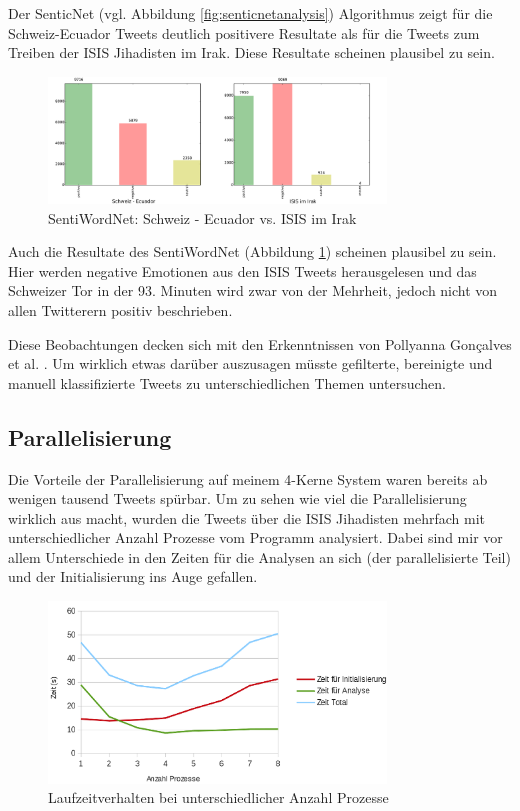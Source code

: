 Der SenticNet (vgl. Abbildung \ref{fig:senticnetanalysis}) Algorithmus zeigt für die Schweiz-Ecuador Tweets deutlich positivere Resultate als für die Tweets zum Treiben der ISIS Jihadisten im Irak. Diese Resultate scheinen plausibel zu sein.

\begin{figure}[h]
  \centering
  \includegraphics[width=0.8\textwidth]{images/schweizvsirak_sentiwordnet.pdf}
  \caption[SentiWordNet: Schweiz - Ecuador vs. ISIS im Irak]{SentiWordNet: Schweiz - Ecuador vs. ISIS im Irak}
  \label{fig:sentiwordnet}
\end{figure}

Auch die Resultate des SentiWordNet (Abbildung \ref{fig:sentiwordnet}) scheinen plausibel zu sein. Hier werden negative Emotionen aus den ISIS Tweets herausgelesen und das Schweizer Tor in der 93. Minuten wird zwar von der Mehrheit, jedoch nicht von allen Twitterern positiv beschrieben.

Diese Beobachtungen decken sich mit den Erkenntnissen von Pollyanna Gonçalves et al. \cite{comparing}. Um wirklich etwas darüber auszusagen müsste gefilterte, bereinigte und manuell klassifizierte Tweets zu unterschiedlichen Themen untersuchen.

\clearpage
\subsection{Parallelisierung}
Die Vorteile der Parallelisierung auf meinem 4-Kerne System waren bereits ab wenigen tausend Tweets spürbar. Um zu sehen wie viel die Parallelisierung wirklich aus macht, wurden die Tweets über die ISIS Jihadisten mehrfach mit unterschiedlicher Anzahl Prozesse vom Programm analysiert. Dabei sind mir vor allem Unterschiede in den Zeiten für die Analysen an sich (der parallelisierte Teil) und der Initialisierung ins Auge gefallen. 

\begin{figure}[h]
  \centering
  \includegraphics[width=0.8\textwidth]{images/parallelisierung_chart.png}
  \caption[Laufzeitverhalten bei unterschiedlicher Anzahl Prozesse]{Laufzeitverhalten bei unterschiedlicher Anzahl Prozesse}
  \label{fig:analyseparallel}
\end{figure}


